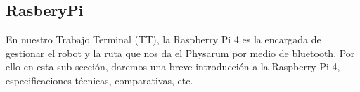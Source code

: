 \subsection{RasberyPi} %
\label{sub:Rasbery}
    En nuestro Trabajo Terminal (TT), la Raspberry Pi 4 es la encargada de gestionar el robot y la ruta que nos da el 
        Physarum por medio de bluetooth. Por ello en esta sub secci\'on, daremos una breve introducci\'on a la Raspberry Pi 4,
        especificaciones t\'ecnicas, comparativas, etc.
    \vskip 0.5cm
    
    
    